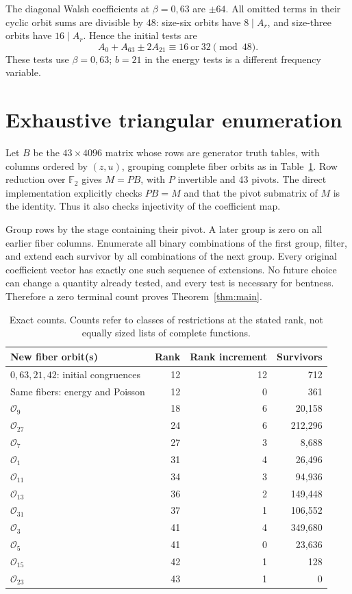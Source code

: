 \documentclass[11pt,a4paper]{article}
\newcommand{\F}{\mathbb F_2}
\begin{document}
The diagonal Walsh coefficients at $\beta=0,63$ are $\pm64$.
All omitted terms in their cyclic orbit sums are divisible by 48:
size-six orbits have $8\mid A_r$, and size-three orbits have
$16\mid A_r$. Hence the initial tests are
\begin{equation}\label{eq:w48}
 A_0+A_{63}\pm2A_{21}\equiv16\ \text{or}\ 32\pmod{48}.
\end{equation}
These tests use $\beta=0,63$; $b=21$ in the energy tests is a different
frequency variable.

\section{Exhaustive triangular enumeration}
Let $B$ be the $43\times4096$ matrix whose rows are generator truth
tables, with columns ordered by $(z,u)$, grouping complete fiber
orbits as in Table~\ref{tab:stages}. Row reduction over $\F$ gives
$M=PB$, with $P$ invertible and 43 pivots. The direct implementation
explicitly checks $PB=M$ and that the pivot submatrix of $M$ is the
identity. Thus it also checks injectivity of the coefficient map.

Group rows by the stage containing their pivot. A later group is zero
on all earlier fiber columns. Enumerate all binary combinations of the
first group, filter, and extend each survivor by all combinations of
the next group. Every original coefficient vector has exactly one
such sequence of extensions. No future choice can change a quantity
already tested, and every test is necessary for bentness. Therefore a
zero terminal count proves Theorem~\ref{thm:main}.

\begin{table}[htbp]\centering
\caption{Exact counts. Counts refer to classes of restrictions at the
stated rank, not equally sized lists of complete functions.}\label{tab:stages}
\begin{tabular}{lrrr}\toprule
New fiber orbit(s) & Rank & Rank increment & Survivors\\\midrule
$0,63,21,42$: initial congruences &12&12&712\\
Same fibers: energy and Poisson &12&0&361\\
$\mathcal O_9$ &18&6&20,158\\
$\mathcal O_{27}$ &24&6&212,296\\
$\mathcal O_7$ &27&3&8,688\\
$\mathcal O_1$ &31&4&26,496\\
$\mathcal O_{11}$ &34&3&94,936\\
$\mathcal O_{13}$ &36&2&149,448\\
$\mathcal O_{31}$ &37&1&106,552\\
$\mathcal O_3$ &41&4&349,680\\
$\mathcal O_5$ &41&0&23,636\\
$\mathcal O_{15}$ &42&1&128\\
$\mathcal O_{23}$ &43&1&0\\\bottomrule
\end{tabular}
\end{table}
\end{document}
